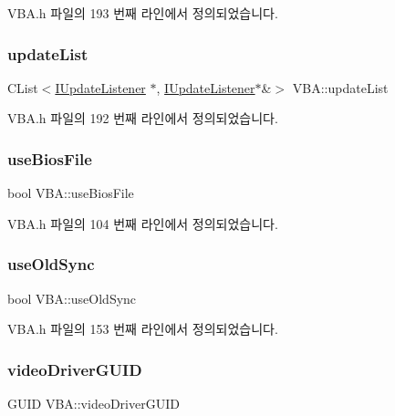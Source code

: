 V\+B\+A.\+h 파일의 193 번째 라인에서 정의되었습니다.

\mbox{\label{class_v_b_a_ad1bea05b3d5cd2fe5c3ea3c98db33ddc}} 
\subsubsection{\texorpdfstring{update\+List}{updateList}}
{\footnotesize\ttfamily C\+List$<$\mbox{\hyperlink{class_i_update_listener}{I\+Update\+Listener}} $\ast$, \mbox{\hyperlink{class_i_update_listener}{I\+Update\+Listener}}$\ast$\&$>$ V\+B\+A\+::update\+List}



V\+B\+A.\+h 파일의 192 번째 라인에서 정의되었습니다.

\mbox{\label{class_v_b_a_a0ad579388cd52cc4df5fadc560f27a37}} 
\subsubsection{\texorpdfstring{use\+Bios\+File}{useBiosFile}}
{\footnotesize\ttfamily bool V\+B\+A\+::use\+Bios\+File}



V\+B\+A.\+h 파일의 104 번째 라인에서 정의되었습니다.

\mbox{\label{class_v_b_a_a8a4b36a4e6259df18baf03360aacad4b}} 
\subsubsection{\texorpdfstring{use\+Old\+Sync}{useOldSync}}
{\footnotesize\ttfamily bool V\+B\+A\+::use\+Old\+Sync}



V\+B\+A.\+h 파일의 153 번째 라인에서 정의되었습니다.

\mbox{\label{class_v_b_a_a797f633003e17035a87922e9f76f8a6d}} 
\subsubsection{\texorpdfstring{video\+Driver\+G\+U\+ID}{videoDriverGUID}}
{\footnotesize\ttfamily G\+U\+ID V\+B\+A\+::video\+Driver\+G\+U\+ID}



